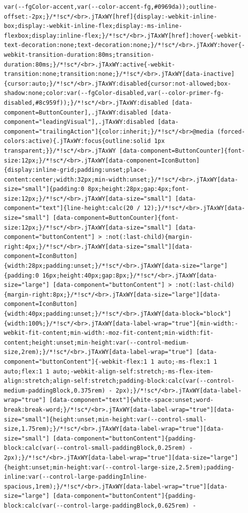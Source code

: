 \documentclass[
  letterpaper,
]{book}
\begin{document}
\begin{verbatim}
var(--fgColor-accent,var(--color-accent-fg,#0969da));outline-offset:-2px;}/*!sc*/<br>.jTAxWY[href]{display:-webkit-inline-box;display:-webkit-inline-flex;display:-ms-inline-flexbox;display:inline-flex;}/*!sc*/<br>.jTAxWY[href]:hover{-webkit-text-decoration:none;text-decoration:none;}/*!sc*/<br>.jTAxWY:hover{-webkit-transition-duration:80ms;transition-duration:80ms;}/*!sc*/<br>.jTAxWY:active{-webkit-transition:none;transition:none;}/*!sc*/<br>.jTAxWY[data-inactive]{cursor:auto;}/*!sc*/<br>.jTAxWY:disabled{cursor:not-allowed;box-shadow:none;color:var(--fgColor-disabled,var(--color-primer-fg-disabled,#8c959f));}/*!sc*/<br>.jTAxWY:disabled [data-component=ButtonCounter],.jTAxWY:disabled [data-component="leadingVisual"],.jTAxWY:disabled [data-component="trailingAction"]{color:inherit;}/*!sc*/<br>@media (forced-colors:active){.jTAxWY:focus{outline:solid 1px transparent;}}/*!sc*/<br>.jTAxWY [data-component=ButtonCounter]{font-size:12px;}/*!sc*/<br>.jTAxWY[data-component=IconButton]{display:inline-grid;padding:unset;place-content:center;width:32px;min-width:unset;}/*!sc*/<br>.jTAxWY[data-size="small"]{padding:0 8px;height:28px;gap:4px;font-size:12px;}/*!sc*/<br>.jTAxWY[data-size="small"] [data-component="text"]{line-height:calc(20 / 12);}/*!sc*/<br>.jTAxWY[data-size="small"] [data-component=ButtonCounter]{font-size:12px;}/*!sc*/<br>.jTAxWY[data-size="small"] [data-component="buttonContent"] > :not(:last-child){margin-right:4px;}/*!sc*/<br>.jTAxWY[data-size="small"][data-component=IconButton]{width:28px;padding:unset;}/*!sc*/<br>.jTAxWY[data-size="large"]{padding:0 16px;height:40px;gap:8px;}/*!sc*/<br>.jTAxWY[data-size="large"] [data-component="buttonContent"] > :not(:last-child){margin-right:8px;}/*!sc*/<br>.jTAxWY[data-size="large"][data-component=IconButton]{width:40px;padding:unset;}/*!sc*/<br>.jTAxWY[data-block="block"]{width:100%;}/*!sc*/<br>.jTAxWY[data-label-wrap="true"]{min-width:-webkit-fit-content;min-width:-moz-fit-content;min-width:fit-content;height:unset;min-height:var(--control-medium-size,2rem);}/*!sc*/<br>.jTAxWY[data-label-wrap="true"] [data-component="buttonContent"]{-webkit-flex:1 1 auto;-ms-flex:1 1 auto;flex:1 1 auto;-webkit-align-self:stretch;-ms-flex-item-align:stretch;align-self:stretch;padding-block:calc(var(--control-medium-paddingBlock,0.375rem) - 2px);}/*!sc*/<br>.jTAxWY[data-label-wrap="true"] [data-component="text"]{white-space:unset;word-break:break-word;}/*!sc*/<br>.jTAxWY[data-label-wrap="true"][data-size="small"]{height:unset;min-height:var(--control-small-size,1.75rem);}/*!sc*/<br>.jTAxWY[data-label-wrap="true"][data-size="small"] [data-component="buttonContent"]{padding-block:calc(var(--control-small-paddingBlock,0.25rem) - 2px);}/*!sc*/<br>.jTAxWY[data-label-wrap="true"][data-size="large"]{height:unset;min-height:var(--control-large-size,2.5rem);padding-inline:var(--control-large-paddingInline-spacious,1rem);}/*!sc*/<br>.jTAxWY[data-label-wrap="true"][data-size="large"] [data-component="buttonContent"]{padding-block:calc(var(--control-large-paddingBlock,0.625rem) - 
\end{verbatim}
\end{document}
